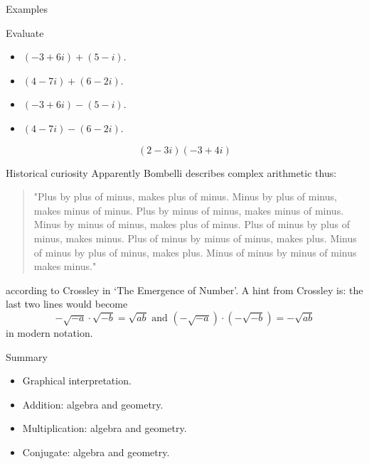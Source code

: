 \documentclass{beamer}
\begin{document}
\begin{frame}{Examples}
\begin{example}
Evaluate
\begin{itemize}
\item $(-3+6i) + (5-i)$.
\item $(4-7i) + (6-2i)$.
\item $(-3+6i) - (5-i)$.
\item $(4-7i) - (6-2i)$.
\end{itemize}
\end{example}
\begin{example}
\begin{equation*} 
(2-3i)(-3+4i) 
\end{equation*}
\end{example}
\end{frame}

\begin{frame}{Historical curiosity}
Apparently Bombelli describes complex arithmetic thus:
\begin{quote}
"Plus by plus of minus, makes plus of minus.
Minus by plus of minus, makes minus of minus.
Plus by minus of minus, makes minus of minus.
Minus by minus of minus, makes plus of minus.
Plus of minus by plus of minus, makes minus.
Plus of minus by minus of minus, makes plus.
Minus of minus by plus of minus, makes plus.
Minus of minus by minus of minus makes minus." 
\end{quote}
according to Crossley in `The Emergence of Number'.
A hint from Crossley is: the last two lines would become 
\begin{equation*}
-\sqrt{-a}\cdot\sqrt{-b}= \sqrt{ab}\text{ and }(-\sqrt{-a})\cdot(-\sqrt{-b})= -\sqrt{ab}
\end{equation*}
in modern notation.
\end{frame}

\begin{frame}{Summary}
\begin{itemize}
	\item Graphical interpretation.
	\item Addition: algebra and geometry.
	\item Multiplication: algebra and geometry.
	\item Conjugate: algebra and geometry.
\end{itemize}
\end{frame}
\end{document}
